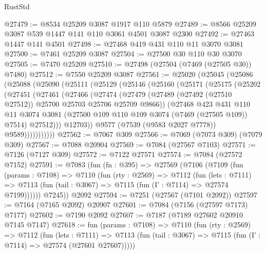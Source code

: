 \begin{lexlean}{RustStd}
\begin{coremodule}
@27479 := @8534 @25209 @3087 @1917 @110 @5879
@27489 := @8566 @25209 @3087 @539 @1447 @141 @110 @3061 @4501 @3087 @2300
@27492 := @27463 @1447 @141 @4501
@27498 := @27468 @419 @431 @110 @11 @3070 @3081
@27500 := @7461 @25209 @3087
@27504 := @27500 @30 @110 @30 @3070
@27505 := @7470 @25209
@27510 := @27498 (@27504 (@7469 (@27505 @30)) @7480)
@27512 := @7550 @25209 @3087
@27561 := @25020
    (@25045
      (@25086
        (@25088
          (@25090
            (@25111
              (@25129
                (@25146
                  (@25160
                    (@25171
                      (@25175
                        (@25202
                          (@27451
                            (@27461
                              (@27466
                                (@27474
                                  (@27479
                                    (@27489
                                      (@27492 (@27510 @27512))
                                      @25700
                                      @25703
                                      @25706
                                      @25709
                                      @9866))
                                  (@27468
                                    @423
                                    @431
                                    @110
                                    @11
                                    @3074
                                    @3081
                                    (@27500 @109 @110 @109 @3074 (@7469 (@27505 @109)) @7514)
                                    @27512)))
                              @12703))
                          @9577
                          (@7539 (@9583 @2027 @7778))
                          @9589)))))))))))
@27562 := @7067 @309
@27566 := @7069 (@7073 @309) (@7079 @309)
@27567 := @7088 @20904
@27569 := @7084 (@27567 @7103)
@27571 := @7126 (@7127 @309)
@27572 := @7122 @27571
@27574 := @7084 (@27572 @7152)
@27591 := @7083
    (fun (fn : @395) =>
    @27569
      (@7106
        (@7109
          (fun (params : @7108) =>
          @7110
            (fun (rty : @2569) =>
            @7112
              (fun (lets : @7111) =>
              @7113 (fun (tail : @3067) => @7115 (fun (Γ : @7114) => @27574 @7199))))))
        @7245))
    @2092
@27594 := @7251 (@27567 (@7101 @2092))
@27597 := @7164 (@7165 @2092) @20907
@27601 := @7084 (@7156 (@27597 @7173) @7177)
@27602 := @7190 @2092
@27607 := @7187 (@7189 @27602 @20910 @7145 @7147)
@27618 := fun (params : @7108) =>
  @7110
    (fun (rty : @2569) =>
    @7112
      (fun (lets : @7111) =>
      @7113 (fun (tail : @3067) => @7115 (fun (Γ : @7114) => @27574 (@27601 @27607)))))

\end{coremodule}
\end{lexlean}
